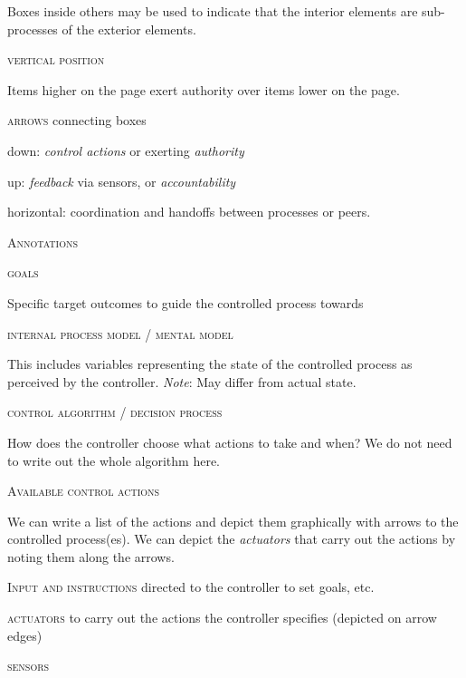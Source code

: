 \documentclass[letterpaper]{tufte-book}
\begin{document}
\begin{landscape}
\begin{multicols}{2}
\begin{compactitem}
 Boxes inside others may be used to indicate that the interior elements are sub-processes of the exterior elements.
 \item \textsc{vertical position} 
 
 Items higher on the page exert authority over items lower on the page. 
\item \textsc{arrows} connecting boxes
\begin{compactitem}
		 \setlength{\itemsep}{0pt}
		\setlength{\parskip}{.25em}
		\item down: \emph{control actions} or exerting \emph{authority}
		\item up: \emph{feedback} via sensors, or \emph{accountability}
		\item horizontal: coordination and handoffs between \hbox{processes} or peers.
	\end{compactitem}
 \end{compactitem}
 
 \columnbreak

\textsc{Annotations}
\begin{compactitem}
\setlength{\itemsep}{0pt}
\setlength{\parskip}{.25em}
\item \textsc{goals} 

Specific target outcomes to guide the controlled process towards
\item \textsc{internal process model / mental model}

This includes variables representing the state of the controlled process as perceived by the controller. \emph{Note}: May differ from actual state.
\item \textsc{control algorithm / decision process}

How does the controller choose what actions to take and when?
We do not need to write out the whole algorithm here.
\item \textsc{Available control actions}

We can write a list of the actions and depict them graphically with arrows to the controlled process(es).
We can depict the \emph{actuators} that carry out the actions by noting them along the arrows.
\end{compactitem}

\begin{compactitem}
\item \textsc{Input and instructions} directed to the controller to set goals, etc.
\item \textsc{actuators} to carry out the actions the controller specifies (depicted on arrow edges)
\item \textsc{sensors}


\end{compactitem}
\end{multicols}
\end{landscape}
\end{document}
